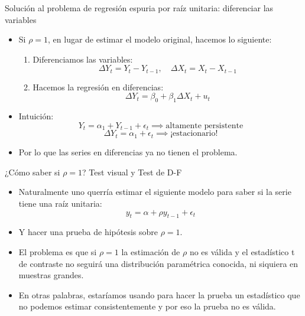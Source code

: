 \documentclass{beamer}
\begin{document}
\begin{frame}{Solución al problema de regresión espuria por raíz unitaria: diferenciar las variables}
    \begin{itemize}
        \item Si $\rho = 1$, en lugar de estimar el modelo original, hacemos lo siguiente:
        \begin{enumerate}
            \item Diferenciamos las variables:
            \[
            \Delta Y_t = Y_t - Y_{t-1}, \quad \Delta X_t = X_t - X_{t-1}
            \]
            \item Hacemos la regresión en diferencias:
            \[
            \Delta Y_t = \beta_0 + \beta_1 \Delta X_t + u_t
            \]
        \end{enumerate}
        \item Intuición:
        \[
        Y_t = \alpha_1 + Y_{t-1} + \epsilon_t \implies \text{altamente persistente}
        \]
        \[
        \Delta Y_t = \alpha_1 + \epsilon_t \implies \text{¡estacionario!}
        \]
        \item Por lo que las series en diferencias ya no tienen el problema.
    \end{itemize}
\end{frame}
\begin{frame}{¿Cómo saber si $\rho = 1$? Test visual y Test de D-F}
    \begin{itemize}
        \item Naturalmente uno querría estimar el siguiente modelo para saber si la serie tiene una raíz unitaria:
        \[
        y_t = \alpha + \rho y_{t-1} + \epsilon_t
        \]
        \item Y hacer una prueba de hipótesis sobre $\rho = 1$.
        \item El problema es que si $\rho = 1$ la estimación de $\rho$ no es válida y el estadístico t de contraste no seguirá una distribución paramétrica conocida, ni siquiera en muestras grandes.
        \item En otras palabras, estaríamos usando para hacer la prueba un estadístico que no podemos estimar consistentemente y por eso la prueba no es válida.
    \end{itemize}
\end{frame}
\end{document}
